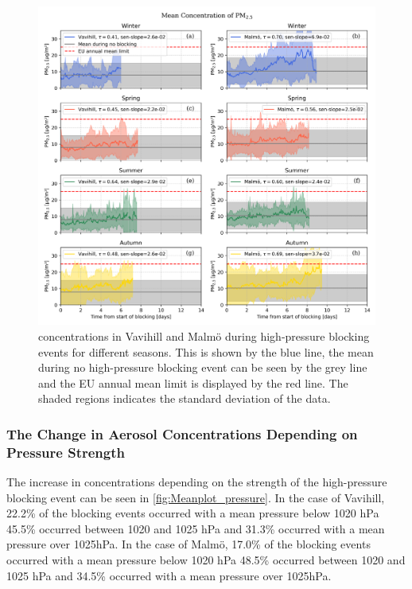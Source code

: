 \begin{figure}[H]
    \centering
    \includegraphics[width=\textwidth]{Figures/Meanplot_seasonal.png}
    \caption{\PM concentrations in Vavihill and Malmö during high-pressure blocking events for different seasons. This is shown by the blue line, the mean during no high-pressure blocking event can be seen by the grey line and the EU annual mean limit is displayed by the red line. The shaded regions indicates the standard deviation of the data.}
    \label{fig:Meanplot_seasonal}
\end{figure}
 

\subsubsection{The Change in Aerosol Concentrations Depending on Pressure Strength}
The increase in \PM concentrations depending on the strength of the high-pressure blocking event can be seen in \autoref{fig:Meanplot_pressure}. In the case of Vavihill, 22.2\% of the blocking events occurred with a mean pressure below 1020 hPa 45.5\% occurred between 1020 and 1025 hPa and 31.3\% occurred with a mean pressure over 1025hPa. In the case of Malmö, 17.0\% of the blocking events occurred with a mean pressure below 1020 hPa 48.5\% occurred between 1020 and 1025 hPa and 34.5\% occurred with a mean pressure over 1025hPa.


